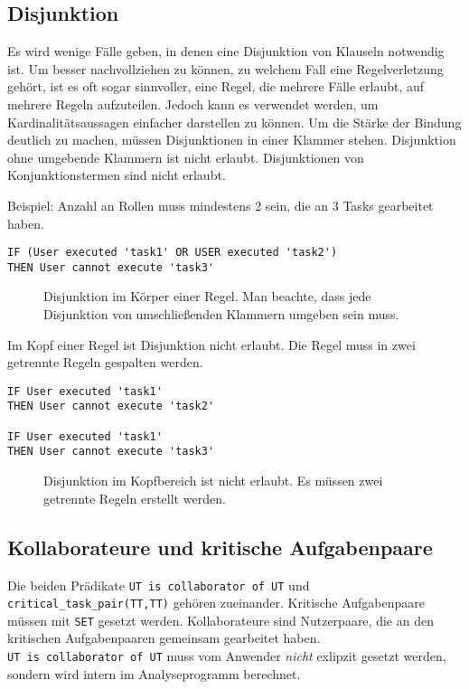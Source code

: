 \subsection{Disjunktion}
\label{sec:disjunction}
Es wird wenige Fälle geben, in denen eine Disjunktion von Klauseln notwendig ist. Um besser nachvollziehen zu können, zu welchem Fall eine Regelverletzung gehört, ist es oft sogar sinnvoller, eine Regel, die mehrere Fälle erlaubt, auf mehrere Regeln aufzuteilen. Jedoch kann es verwendet werden, um Kardinalitätsaussagen einfacher darstellen zu können. Um die Stärke der Bindung deutlich zu machen, müssen Disjunktionen in einer Klammer stehen. Disjunktion ohne umgebende Klammern ist nicht erlaubt. Disjunktionen von Konjunktionstermen sind nicht erlaubt.

Beispiel: Anzahl an Rollen muss mindestens 2 sein, die an 3 Tasks gearbeitet haben.

\begin{verbatim}
IF (User executed 'task1' OR USER executed 'task2')
THEN User cannot execute 'task3'
\end{verbatim}
\begin{figure}[!h]
\caption{Disjunktion im Körper einer Regel. Man beachte, dass jede Disjunktion von umschließenden Klammern umgeben sein muss.}
\label{fig:disjunction1}
\end{figure}

Im Kopf einer Regel ist Disjunktion nicht erlaubt. Die Regel muss in zwei getrennte Regeln gespalten werden.

\begin{verbatim}
IF User executed 'task1'
THEN User cannot execute 'task2'

IF User executed 'task1'
THEN User cannot execute 'task3'
\end{verbatim}
\begin{figure}[!h]
\caption{Disjunktion im Kopfbereich ist nicht erlaubt. Es müssen zwei getrennte Regeln erstellt werden.}
\label{fig:disjunction2}
\end{figure}

\subsection{Kollaborateure und kritische Aufgabenpaare}
Die beiden Prädikate \texttt{UT is collaborator of UT} und \texttt{critical\_task\_pair(TT,TT)} gehören zueinander.
Kritische Aufgabenpaare müssen mit \texttt{SET} gesetzt werden. Kollaborateure sind Nutzerpaare, die an den kritischen Aufgabenpaaren gemeinsam gearbeitet haben.
\\\texttt{UT is collaborator of UT} muss vom Anwender \textit{nicht} exlipzit gesetzt werden, sondern wird intern im Analyseprogramm berechnet. 

